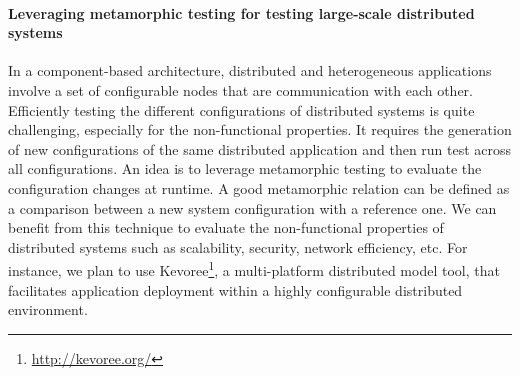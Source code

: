 \paragraph{Leveraging metamorphic testing for testing large-scale distributed systems}
In a component-based architecture, distributed and heterogeneous applications involve a set of configurable nodes that are communication with each other. Efficiently testing the different configurations of distributed systems is quite challenging, especially for the non-functional properties. It requires the generation of new configurations of the same distributed application and then run test across all configurations. An idea is to leverage metamorphic testing to evaluate the configuration changes at runtime. 
A good metamorphic relation can be defined as a comparison between a new system configuration with a reference one.
We can benefit from this technique to evaluate the non-functional properties of distributed systems such as scalability, security, network efficiency, etc. For instance, we plan to use Kevoree\footnote{\url{http://kevoree.org/}}, a multi-platform distributed model tool, that facilitates application deployment within a highly configurable distributed environment.
